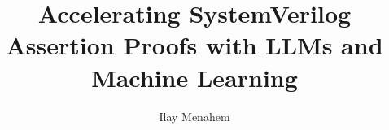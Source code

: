 \documentclass[12pt]{article}
\begin{document}
\title{Accelerating SystemVerilog Assertion Proofs with LLMs and Machine Learning}
\author{Ilay Menahem}

\maketitle











\appendix




\end{document}

